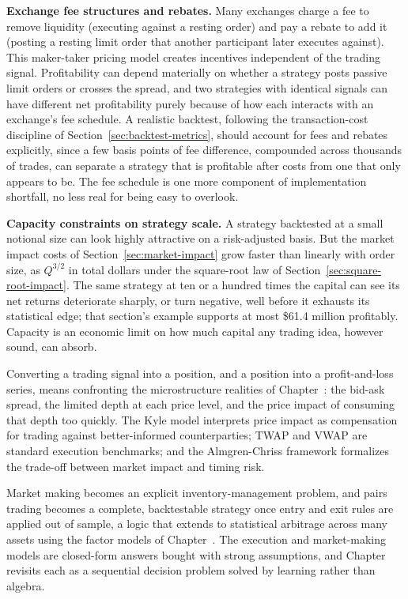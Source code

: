 \documentclass[../ai_in_finance]{subfiles}
\begin{document}
\textbf{Exchange fee structures and rebates.} Many exchanges charge a fee to remove liquidity (executing against a resting order) and pay a rebate to add it (posting a resting limit order that another participant later executes against). This maker-taker pricing model creates incentives independent of the trading signal. Profitability can depend materially on whether a strategy posts passive limit orders or crosses the spread, and two strategies with identical signals can have different net profitability purely because of how each interacts with an exchange's fee schedule. A realistic backtest, following the transaction-cost discipline of Section~\ref{sec:backtest-metrics}, should account for fees and rebates explicitly, since a few basis points of fee difference, compounded across thousands of trades, can separate a strategy that is profitable after costs from one that only appears to be. The fee schedule is one more component of implementation shortfall, no less real for being easy to overlook.

\textbf{Capacity constraints on strategy scale.} A strategy backtested at a small notional size can look highly attractive on a risk-adjusted basis. But the market impact costs of Section~\ref{sec:market-impact} grow faster than linearly with order size, as $Q^{3/2}$ in total dollars under the square-root law of Section~\ref{sec:square-root-impact}. The same strategy at ten or a hundred times the capital can see its net returns deteriorate sharply, or turn negative, well before it exhausts its statistical edge; that section's example supports at most \$61.4 million profitably. Capacity is an economic limit on how much capital any trading idea, however sound, can absorb.


Converting a trading signal into a position, and a position into a profit-and-loss series, means confronting the microstructure realities of Chapter~: the bid-ask spread, the limited depth at each price level, and the price impact of consuming that depth too quickly. The Kyle model interprets price impact as compensation for trading against better-informed counterparties; TWAP and VWAP are standard execution benchmarks; and the Almgren-Chriss framework formalizes the trade-off between market impact and timing risk.

Market making becomes an explicit inventory-management problem, and pairs trading becomes a complete, backtestable strategy once entry and exit rules are applied out of sample, a logic that extends to statistical arbitrage across many assets using the factor models of Chapter~. The execution and market-making models are closed-form answers bought with strong assumptions, and Chapter~ revisits each as a sequential decision problem solved by learning rather than algebra.
\end{document}

